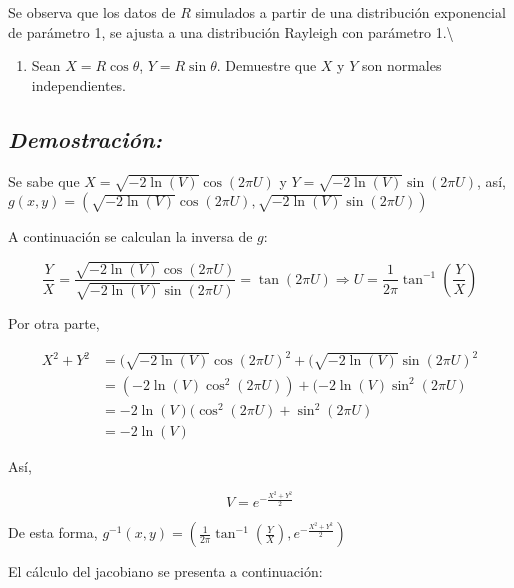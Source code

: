 \documentclass[]{article}
\providecommand{\tightlist}{%
  \setlength{\itemsep}{0pt}\setlength{\parskip}{0pt}}
\begin{document}
Se observa que los datos de \(R\) simulados a partir de una distribución
exponencial de parámetro 1, se ajusta a una distribución Rayleigh con
parámetro 1.\textbackslash{}

\begin{enumerate}
\def\labelenumi{\alph{enumi}.}
\setcounter{enumi}{1}
\tightlist
\item
  Sean \(X=R \cos\theta\), \(Y=R\sin\theta\). Demuestre que \(X\) y
  \(Y\) son normales independientes.
\end{enumerate}

\subsection{\texorpdfstring{\emph{Demostración:}}{Demostración:}}\label{demostracion-3}

Se sabe que \(X=\sqrt{-2\ln(V)}\cos(2\pi U)\) y
\(Y=\sqrt{-2\ln(V)}\sin(2\pi U)\), así,
\(g(x,y)=(\sqrt{-2\ln(V)}\cos(2\pi U),\sqrt{-2\ln(V)}\sin(2\pi U))\)

A continuación se calculan la inversa de \(g\):

\begin{equation}
\frac{Y}{X}=\frac{\sqrt{-2\ln(V)}\cos(2\pi U)}{\sqrt{-2\ln(V)}\sin(2\pi U)}
=\tan(2 \pi U) \Rightarrow U=\frac{1}{2 \pi}\tan^{-1}\left( \frac{Y}{X}  \right)
\end{equation}

Por otra parte,

\begin{equation}
\begin{split}
X^2+Y^2&=(\sqrt{-2\ln(V)}\cos(2\pi U)^2+(\sqrt{-2\ln(V)}\sin(2\pi U)^2\\
&= (-2\ln(V)\cos^2(2\pi U))+(-2\ln(V)\sin^2(2\pi U)\\
&= -2\ln(V)(\cos^2(2\pi U)+\sin^2(2\pi U)\\
&= -2\ln(V)
\end{split}
\end{equation}

Así,

\begin{equation}
V = e^{-\frac{X^2+Y^2}{2}}
\end{equation}

De esta forma,
\(g^{-1}(x,y)= \left(\frac{1}{2 \pi}\tan^{-1}\left( \frac{Y}{X} \right),e^{-\frac{X^2+Y^2}{2}}\right)\)

El cálculo del jacobiano se presenta a continuación:
\end{document}
